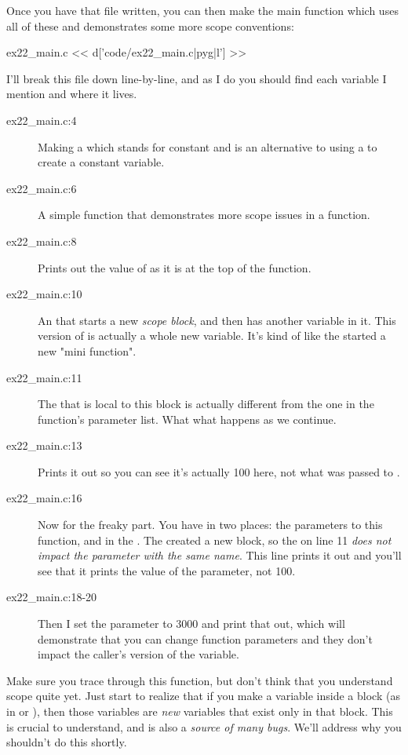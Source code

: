 Once you have that file written, you can then make the main function which
uses all of these and demonstrates some more scope conventions:

\begin{code}{ex22\_main.c}
<< d['code/ex22_main.c|pyg|l'] >>
\end{code}

I'll break this file down line-by-line, and as I do you should find each
variable I mention and where it lives.

\begin{description}
\item[ex22\_main.c:4] Making a  which stands for constant and is an 
    alternative to using a  to create a constant variable.
\item[ex22\_main.c:6] A simple function that demonstrates more scope issues in a function.
\item[ex22\_main.c:8] Prints out the value of  as it is at the top of the function.
\item[ex22\_main.c:10] An  that starts a new \emph{scope block}, and then
    has another  variable in it.  This version of 
    is actually a whole new variable. It's kind of like the 
    started a new "mini function".
\item[ex22\_main.c:11] The  that is local to this block is actually different
    from the one in the function's parameter list.  What what happens as we 
    continue.
\item[ex22\_main.c:13] Prints it out so you can see it's actually 100 here, not what was
    passed to .
\item[ex22\_main.c:16] Now for the freaky part.  You have  in two places: the
    parameters to this function, and in the .  The
     created a new block, so the  on line
    11 \emph{does not impact the parameter with the same name}.  This line
    prints it out and you'll see that it prints the value of the parameter, 
    not 100.
\item[ex22\_main.c:18-20] Then I set the parameter  to 3000 and print that
    out, which will demonstrate that you can change function parameters
    and they don't impact the caller's version of the variable.
\end{description}

Make sure you trace through this function, but don't think that you understand
scope quite yet.  Just start to realize that if you make a variable inside a
block (as in  or ), then those variables
are \emph{new} variables that exist only in that block.  This is crucial to 
understand, and is also a \emph{source of many bugs}.  We'll address why
you shouldn't do this shortly.

